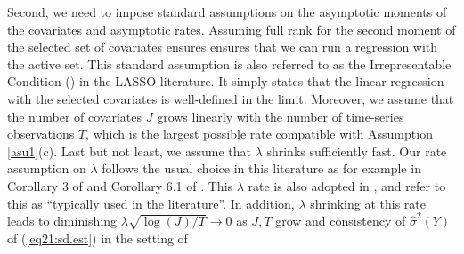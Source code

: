 \documentclass[11pt]{article}
\def\cmt#1{{\textcolor{red}{(#1)}}}
\begin{document}
Second, we need to impose standard assumptions on the asymptotic moments of the covariates and asymptotic rates. Assuming full rank for the second moment of the selected set of covariates ensures ensures that we can run a regression with the active set. This standard assumption is also referred to as the Irrepresentable Condition (\cite{zhao2006model}) in the LASSO literature. It simply states that the linear regression with the selected covariates is well-defined in the limit. Moreover, we assume that the number of covariates $J$ grows linearly with the number of time-series observations $T$, which is the largest possible rate compatible with Assumption \ref{asu1}(c). Last but not least, we assume that $\lambda$ shrinks sufficiently fast. Our rate assumption on $\lambda$ follows the usual choice in this literature as for example in Corollary 3 of \cite{10.1214/12-STS400} and Corollary 6.1 of \cite{BG}. This $\lambda$ rate is also adopted in \cite{tian2017asymptotics}, and \cite{10.3150/11-BEJ410} refer to this as ``typically used in the literature''. In addition, $\lambda$ shrinking at this rate leads to diminishing $\lambda\sqrt{\log(J)/T}\to 0$ as $J,T$ grow and consistency of $\hat{\sigma}^2(Y)$ of (\ref{eq21:sd.est}) in the setting of \cite{chatterjee2014assumptionless}




\end{document}
